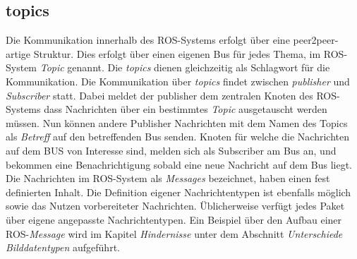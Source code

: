 		\subsection{topics}
		Die Kommunikation innerhalb des ROS-Systems erfolgt über eine peer2peer-artige Struktur. Dies erfolgt über einen eigenen Bus für jedes Thema, im ROS-System \textit{Topic} genannt. Die \textit{topics} dienen gleichzeitig als Schlagwort für die Kommunikation. Die Kommunikation über \textit{topics} findet zwischen \textit{publisher} und \textit{Subscriber} statt. Dabei meldet der publisher dem zentralen Knoten des ROS-Systems dass Nachrichten über ein bestimmtes \textit{Topic} ausgetauscht werden müssen. Nun können andere Publisher Nachrichten mit dem Namen des Topics als \textit{Betreff} auf den betreffenden Bus senden. Knoten für welche die Nachrichten auf dem BUS von Interesse sind, melden sich als Subscriber am Bus an, und bekommen eine Benachrichtigung sobald eine neue Nachricht auf dem Bus liegt. Die Nachrichten im ROS-System als \textit{Messages} bezeichnet, haben einen fest definierten Inhalt. Die Definition eigener Nachrichtentypen ist ebenfalls möglich sowie das Nutzen vorbereiteter Nachrichten. Üblicherweise verfügt jedes Paket über eigene angepasste Nachrichtentypen. Ein Beispiel über den Aufbau einer ROS-\textit{Message} wird im Kapitel \textit{Hindernisse} unter dem Abschnitt \textit{Unterschiede Bilddatentypen} aufgeführt.\newline \cite{ros-topics}
